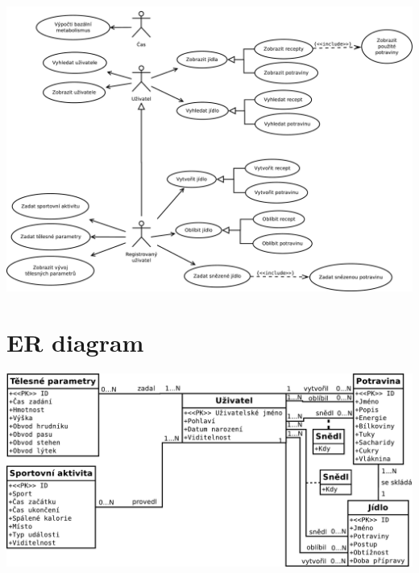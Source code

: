 \documentclass[12pt,a4paper]{article}
\begin{document}
\vspace*{\fill}
\begin{center}
\includegraphics[angle=90,origin=c,height = \textwidth]{img/use-case.pdf} \\
\end{center}
\vspace*{\fill}

\newpage

\section{ER diagram}

\vspace*{\fill}
\begin{center}
\includegraphics[angle=90,origin=c,height = \textwidth]{img/er.pdf} \\
\end{center}
\vspace*{\fill}
\end{document}
